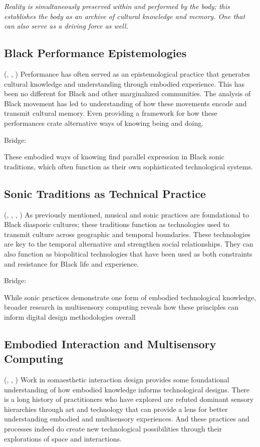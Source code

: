\textit{Reality is simultaneously preserved within and performed by the body; this establishes the body as an archive of cultural knowledge and memory. One that can also serve as a driving force as well.
}

\subsection{Black Performance Epistemologies}(\parencite{Patrick_2003}, \parencite{DeFrantz_2006}, \parencite{DeFrantz_Gonzalez_2014})
Performance has often served as an epistemological practice that generates cultural knowledge and understanding through embodied experience. This has been no different for Black and other marginalized communities. The analysis of Black movement has led to understanding of how these movements encode and transmit cultural memory. Even providing a framework for how these performances crate alternative ways of knowing being and doing.

Bridge:

These embodied ways of knowing find parallel expression in Black sonic traditions, which often function as their own sophisticated technological systems.

\subsection{Sonic Traditions as Technical Practice}(\parencite{Gilroy_1993}, \parencite{Weheliye_2005}, \parencite{Weheliye_2014}, \parencite{weheliye2005})
As previously mentioned, musical and sonic practices are foundational to Black diasporic cultures; these traditions function as technologies used to transmit culture across geographic and temporal boundaries. These technologies are key to the temporal alternative and strengthen social relationships. They can also function as biopolitical technologies that have been used as both constraints and resistance for Black life and experience.

Bridge:

While sonic practices demonstrate one form of embodied technological knowledge, broader research in multisensory computing reveals how these principles can inform digital design methodologies overall

\subsection{Embodied Interaction and Multisensory Computing}(\parencite{Hook_2018}, \parencite{Jones_Arning_Farver_2006}, \parencite{Sha_2013})
Work in somaesthetic interaction design provides some foundational understanding of how embodied knowledge informs technological designs. There is a long history of practitioners who have explored are refuted dominant sensory hierarchies through art and technology that can provide a lens for better understanding embodied and multisensory experiences. And these practices and processes indeed do create new technological possibilities through their explorations of space and interactions.

